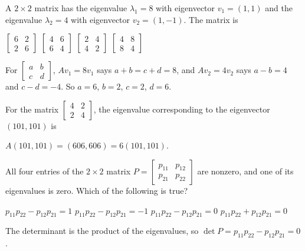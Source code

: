 \begin{question}[id=gate-ec2006-2, source=GATE EC 2006, marks=2]
A $2 \times 2$ matrix has the eigenvalue $\lambda_1 = 8$ with eigenvector $v_1 = (1, 1)$ and the eigenvalue $\lambda_2 = 4$ with eigenvector $v_2 = (1, -1)$. The matrix is
\begin{options}
  \correct $\begin{bmatrix} 6 & 2 \\ 2 & 6 \end{bmatrix}$
  \option $\begin{bmatrix} 4 & 6 \\ 6 & 4 \end{bmatrix}$
  \option $\begin{bmatrix} 2 & 4 \\ 4 & 2 \end{bmatrix}$
  \option $\begin{bmatrix} 4 & 8 \\ 8 & 4 \end{bmatrix}$
\end{options}
\begin{solution}
For $\begin{bmatrix} a & b \\ c & d \end{bmatrix}$, $Av_1 = 8v_1$ says $a + b = c + d = 8$, and $Av_2 = 4v_2$ says $a - b = 4$ and $c - d = -4$. So $a = 6$, $b = 2$, $c = 2$, $d = 6$.
\end{solution}
\end{question}

\begin{question}[id=gate-ec2006-3, source=GATE EC 2006]
For the matrix $\begin{bmatrix} 4 & 2 \\ 2 & 4 \end{bmatrix}$, the eigenvalue corresponding to the eigenvector $(101, 101)$ is
\begin{options}
\end{options}
\begin{solution}
$A(101, 101) = (606, 606) = 6(101, 101)$.
\end{solution}
\end{question}

\begin{question}[id=gate-ec2008-2, source=GATE EC 2008]
All four entries of the $2 \times 2$ matrix $P = \begin{bmatrix} p_{11} & p_{12} \\ p_{21} & p_{22} \end{bmatrix}$ are nonzero, and one of its eigenvalues is zero. Which of the following is true?
\begin{options}
  \option $p_{11}p_{22} - p_{12}p_{21} = 1$
  \option $p_{11}p_{22} - p_{12}p_{21} = -1$
  \correct $p_{11}p_{22} - p_{12}p_{21} = 0$
  \option $p_{11}p_{22} + p_{12}p_{21} = 0$
\end{options}
\begin{solution}
The determinant is the product of the eigenvalues, so $\det P = p_{11}p_{22} - p_{12}p_{21} = 0$.
\end{solution}
\end{question}

